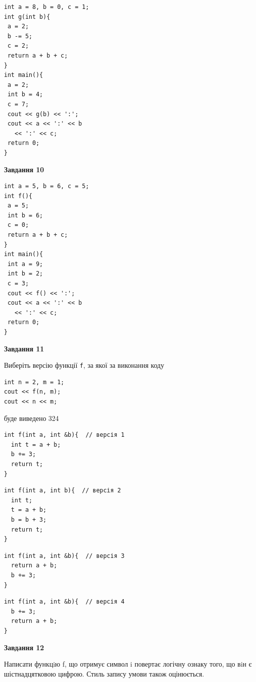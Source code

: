 \documentclass[12pt, ukrainian]{article}
\def\code#1{\Verb!#1!}
\begin{document}
{\begin {large}
\begin{minipage}[t]{7.0cm}
\begin{verbatim}
int a = 8, b = 0, c = 1;
int g(int b){
 a = 2;
 b -= 5;
 c = 2;
 return a + b + c;
}
int main(){
 a = 2;
 int b = 4;
 c = 7;
 cout << g(b) << ':';
 cout << a << ':' << b 
   << ':' << c;
 return 0;
}
\end{verbatim}



\begin{center}
\textbf{Завдання 10}
\end{center}
\vspace{-8mm}

\begin{verbatim}
int a = 5, b = 6, c = 5;
int f(){
 a = 5;
 int b = 6;
 c = 0;
 return a + b + c;
}
int main(){
 int a = 9;
 int b = 2;
 c = 3;
 cout << f() << ':';
 cout << a << ':' << b 
   << ':' << c;
 return 0;
}
\end{verbatim}

\end{minipage}
\vline \hspace{1mm}
\begin{minipage}[t]{11.0cm}

\begin{center}
\textbf{Завдання 11}
\end{center}
Виберіть версію функції \code{f}, за якої за виконання коду
\begin{verbatim}
int n = 2, m = 1;
cout << f(n, m);
cout << n << m;
\end{verbatim}

буде виведено 324

\begin{verbatim}
int f(int a, int &b){  // версія 1
  int t = a + b;
  b += 3;
  return t;
}
\end{verbatim}

\vspace{-8mm}\begin{verbatim}
int f(int a, int b){  // версія 2
  int t;
  t = a + b;
  b = b + 3;
  return t;
}
\end{verbatim}

\vspace{-8mm}\begin{verbatim}
int f(int a, int &b){  // версія 3
  return a + b;
  b += 3;
}
\end{verbatim}

\vspace{-8mm}\begin{verbatim}
int f(int a, int &b){  // версія 4
  b += 3;
  return a + b;
}
\end{verbatim}



\begin{center}
\textbf{Завдання 12}
\end{center}

Написати функцiю f, що отримує символ i повертає логічну ознаку того, що вiн є шістнадцятковою цифрою. Стиль запису умови також оцінюється.\par

\end{minipage}

\end {large}}
\newpage
\end{document}
